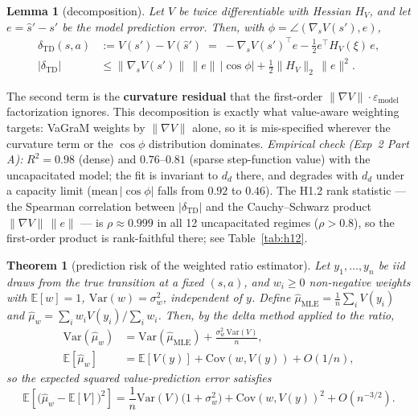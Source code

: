 \documentclass[11pt]{article}
\newtheorem{theorem}{Theorem}
\newtheorem{lemma}{Lemma}
\begin{document}
\begin{lemma}[decomposition]
\label{lem:decomp}
Let $V$ be twice differentiable with Hessian $H_V$, and let $e = \hat{s}' - s'$ be the
model prediction error. Then, with $\phi = \angle(\nabla_s V(s'), e)$,
\begin{align}
  \delta_{\mathrm{TD}}(s,a) &:= V(s') - V(\hat{s}') 
    \;=\; - \nabla_s V(s')^{\top} e - \tfrac{1}{2} e^{\top} H_V(\xi)\, e, \\
  \lvert \delta_{\mathrm{TD}} \rvert
    &\le \lVert \nabla_s V(s')\rVert\, \lVert e\rVert\, \lvert\cos\phi\rvert
       + \tfrac{1}{2} \lVert H_V \rVert_2\, \lVert e\rVert^2.
\end{align}
\end{lemma}

The second term is the \textbf{curvature residual} that the first-order
$\lVert \nabla V\rVert \cdot \varepsilon_{\mathrm{model}}$ factorization ignores. This
decomposition is exactly what value-aware weighting targets: VaGraM weights by
$\lVert \nabla V\rVert$ alone, so it is mis-specified wherever the curvature term or the
$\cos\phi$ distribution dominates. \emph{Empirical check (Exp~2 Part A):}
$R^2 = 0.98$ (dense) and $0.76$--$0.81$ (sparse step-function value) with the
uncapacitated model; the fit is invariant to $d_d$ there, and degrades with $d_d$ under
a capacity limit ($\mathrm{mean}\,\lvert\cos\phi\rvert$ falls from $0.92$ to $0.46$).
The H1.2 rank statistic --- the Spearman correlation between $\lvert\delta_{\mathrm{TD}}\rvert$
and the Cauchy--Schwarz product $\lVert\nabla V\rVert\,\lVert e\rVert$ --- is
$\rho \approx 0.999$ in all 12 uncapacitated regimes ($\rho > 0.8$), so the first-order
product is rank-faithful there; see Table~\ref{tab:h12}.

\begin{theorem}[prediction risk of the weighted ratio estimator]
\label{thm:pred}
Let $y_1, \dots, y_n$ be iid draws from the true transition at a fixed $(s,a)$, and
$w_i \ge 0$ non-negative weights with $\mathbb{E}[w] = 1$, $\mathrm{Var}(w) = \sigma_w^2$,
independent of $y$. Define $\hat{\mu}_{\mathrm{MLE}} = \frac{1}{n}\sum_i V(y_i)$ and
$\hat{\mu}_w = \sum_i w_i V(y_i) / \sum_i w_i$. Then, by the delta method applied to the
ratio,
\begin{align}
  \mathrm{Var}(\hat{\mu}_w) &= \mathrm{Var}(\hat{\mu}_{\mathrm{MLE}})
    + \frac{\sigma_w^2\, \mathrm{Var}(V)}{n}, \\
  \mathbb{E}[\hat{\mu}_w] &= \mathbb{E}[V(y)] + \mathrm{Cov}(w, V(y)) + O(1/n),
\end{align}
so the expected squared value-prediction error satisfies
\begin{equation}
  \mathbb{E}\!\left[\bigl(\hat{\mu}_w - \mathbb{E}[V]\bigr)^2\right]
  = \frac{1}{n}\mathrm{Var}(V)\bigl(1 + \sigma_w^2\bigr)
    + \mathrm{Cov}(w, V(y))^2 + O(n^{-3/2}).
\end{equation}
\end{theorem}
\end{document}
